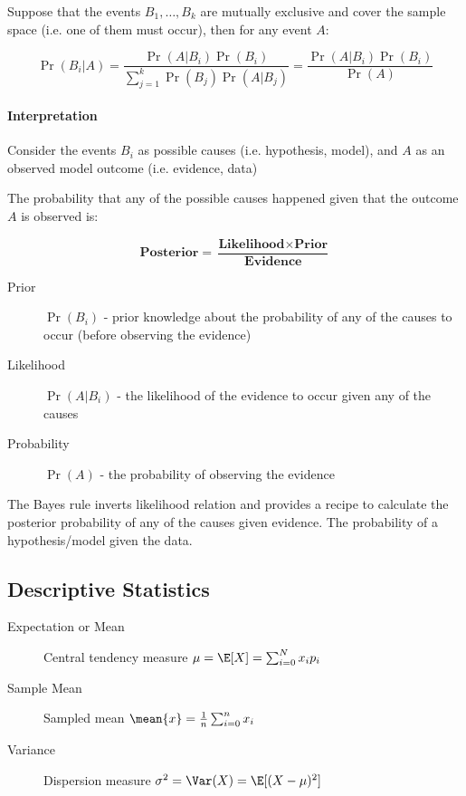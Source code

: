 \documentclass{idc_msc}
\begin{document}
Suppose that the events $B_1,\ldots,B_k$ are mutually exclusive and cover the sample space (i.e. one of them must occur), then for any event $A$:

\[
  \Pr(B_i|A) = \frac{\Pr(A|B_i)\Pr(B_i)}{\sum_{j=1}^{k}\Pr(B_j)\Pr(A|B_j)} = \frac{\Pr(A|B_i)\Pr(B_i)}{\Pr(A)}
\]

\paragraph{Interpretation}

Consider the events $B_i$ as possible causes (i.e. hypothesis, model), and $A$ as an observed model outcome (i.e. evidence, data)

The probability that any of the possible causes happened given that the outcome $A$ is observed is:

\[ \textbf{Posterior} = \frac{\textbf{Likelihood} \times \textbf{Prior}}{\textbf{Evidence}} \]

\begin{description}
  \item[Prior] $\Pr(B_i)$ - prior knowledge about the probability of any of the causes to occur (before observing the evidence)
  \item[Likelihood] $\Pr(A|B_i)$ - the likelihood of the evidence to occur given any of the causes
  \item[Probability] $\Pr(A)$ - the probability of observing the evidence 
\end{description}

The Bayes rule inverts likelihood relation and provides a recipe to calculate the posterior probability of any of the causes given evidence.
The probability of a hypothesis/model given the data.

\subsection{Descriptive Statistics}

\begin{description}
  \item[Expectation or Mean] Central tendency measure $\mu = \E[X] = \sum_{i=0}^{N} x_i p_i$
  \item[Sample Mean] Sampled mean $\mean{x} = \frac{1}{n}\sum_{i=0}^{n}x_i$
  \item[Variance] Dispersion measure $\sigma^2=\Var(X) = \E[(X-\mu)^2]$
\end{description}

\end{document}
